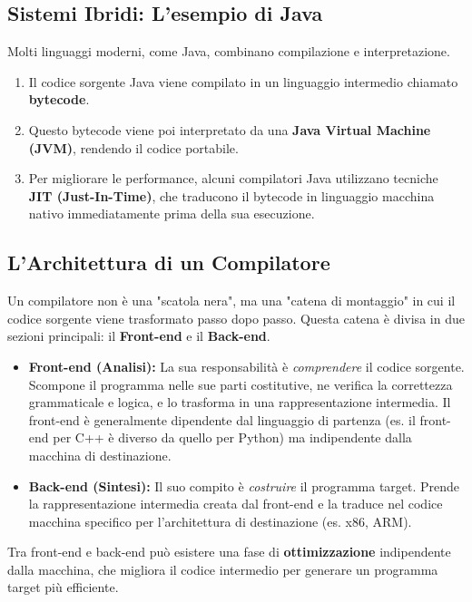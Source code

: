 \documentclass[a4paper, 11pt]{article}
\begin{document}
\subsection{Sistemi Ibridi: L'esempio di Java}
Molti linguaggi moderni, come Java, combinano compilazione e interpretazione.
\begin{enumerate}
    \item Il codice sorgente Java viene compilato in un linguaggio intermedio chiamato \textbf{bytecode}.
    \item Questo bytecode viene poi interpretato da una \textbf{Java Virtual Machine (JVM)}, rendendo il codice portabile.
    \item Per migliorare le performance, alcuni compilatori Java utilizzano tecniche \textbf{JIT (Just-In-Time)}, che traducono il bytecode in linguaggio macchina nativo immediatamente prima della sua esecuzione.
\end{enumerate}

\subsection{L'Architettura di un Compilatore}

Un compilatore non è una "scatola nera", ma una "catena di montaggio" in cui il codice sorgente viene trasformato passo dopo passo. Questa catena è divisa in due sezioni principali: il \textbf{Front-end} e il \textbf{Back-end}.

\begin{itemize}
    \item \textbf{Front-end (Analisi):} La sua responsabilità è \textit{comprendere} il codice sorgente. Scompone il programma nelle sue parti costitutive, ne verifica la correttezza grammaticale e logica, e lo trasforma in una rappresentazione intermedia. Il front-end è generalmente dipendente dal linguaggio di partenza (es. il front-end per C++ è diverso da quello per Python) ma indipendente dalla macchina di destinazione.

    \item \textbf{Back-end (Sintesi):} Il suo compito è \textit{costruire} il programma target. Prende la rappresentazione intermedia creata dal front-end e la traduce nel codice macchina specifico per l'architettura di destinazione (es. x86, ARM).
\end{itemize}

Tra front-end e back-end può esistere una fase di \textbf{ottimizzazione} indipendente dalla macchina, che migliora il codice intermedio per generare un programma target più efficiente.
\end{document}
